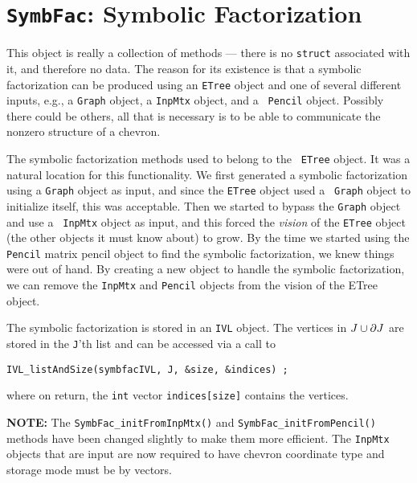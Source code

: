 \chapter{{\tt SymbFac}: Symbolic Factorization}
\label{chapter:SymbFac}
\par
This object is really a collection of methods --- there is no
{\tt struct} associated with it, and therefore no data. The reason
for its existence is that a symbolic factorization can be produced
using an {\tt ETree} object and one of several different inputs,
e.g., a {\tt Graph} object, a {\tt InpMtx} object, and a {\tt
Pencil} object.
Possibly there could be others, all that is necessary is to be able
to communicate the nonzero structure of a chevron.
\par
The symbolic factorization methods used to belong to the {\tt
ETree} object. It was a natural location for this functionality.
We first generated a symbolic factorization using a {\tt Graph}
object as input, and since the {\tt ETree} object used a {\tt
Graph} object to initialize itself, this was acceptable.
Then we started to bypass the {\tt Graph} object and use a {\tt
InpMtx} object as input, and this forced the {\it vision} of the
{\tt ETree} object (the other objects it must know about) to grow.
By the time we started using the {\tt Pencil} matrix pencil object
to find the symbolic factorization, we knew things were out of
hand.
By creating a new object to handle the symbolic factorization,
we can remove the {\tt InpMtx} and {\tt Pencil} objects from the
vision of the ETree object.
\par
The symbolic factorization is stored in an {\tt IVL} object.
The vertices in $J \cup {\partial{J}}$ are stored in the {\tt J}'th
list and can be accessed via a call to
\begin{verbatim}
IVL_listAndSize(symbfacIVL, J, &size, &indices) ;
\end{verbatim}
where on return, the {\tt int} vector {\tt indices[size]} 
contains the vertices.
\par
{\bf NOTE:} The {\tt SymbFac\_initFromInpMtx()}
and {\tt SymbFac\_initFromPencil()} methods have been changed
slightly to make them more efficient.
The {\tt InpMtx} objects that are input are now required to have
chevron coordinate type and storage mode must be by vectors.
